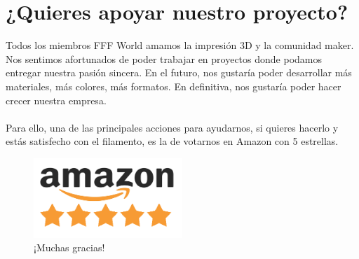 \documentclass[11pt,a4paper]{article}
\begin{document}
\section{¿Quieres apoyar nuestro proyecto?}
Todos los miembros FFF World amamos la impresión 3D y la comunidad maker. Nos sentimos afortunados de poder trabajar en proyectos donde podamos entregar nuestra pasión sincera. En el futuro, nos gustaría poder desarrollar más materiales, más colores, más formatos. En definitiva, nos gustaría poder hacer crecer nuestra empresa.
\\\\
Para ello, una de las principales acciones para ayudarnos, si quieres hacerlo y estás satisfecho con el filamento, es la de votarnos en Amazon con 5 estrellas.
\begin{figure}[H]
\centering
\includegraphics[width=0.5\textwidth,cfbox=azul_marcos 1pt 0pt]{FOTOS/AMAZON_FIVE_STARS}
\caption*{¡Muchas gracias!}
\end{figure}
\end{document}
